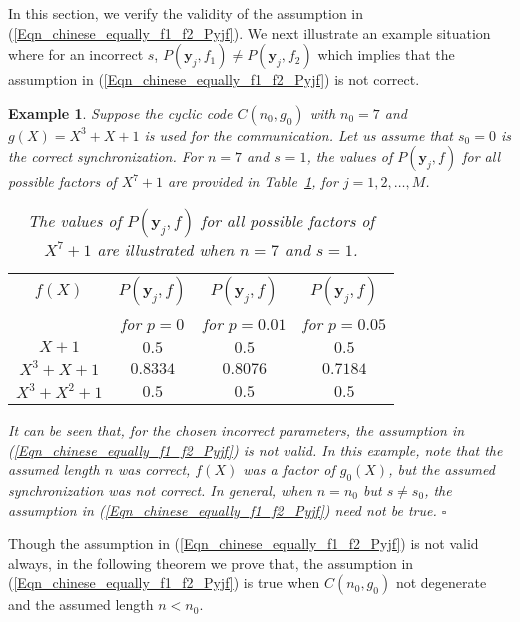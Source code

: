 \documentclass[10pt,journal]{IEEEtran}
\newtheorem{example}{Example}
\begin{document}
In this section, we verify the validity of the assumption in (\ref{Eqn_chinese_equally_f1_f2_Pyjf}).
We next illustrate an example situation where for an incorrect $s$, $P(\mathbf{y}_j,f_1) \neq P(\mathbf{y}_j,f_2)$
which implies that the assumption in (\ref{Eqn_chinese_equally_f1_f2_Pyjf}) is not correct.
% 
\begin{example}
\label{Example_chinese_counterEx}
%  
Suppose the cyclic code $C(n_0,g_0)$ with $n_0=7$ and $g(X)=X^3+X+1$ is used for the communication.
Let us assume that $s_0=0$ is the correct synchronization.
% 
For $n=7$ and $s=1$, the values of $P(\mathbf{y}_j,f)$
for all possible factors of $X^{7}+1$ are provided in Table~\ref{Table_chinese_counterex}, for $j = 1,2,\ldots,M$.
% 
\begin{table}[htbp]
% 
\begin{center}
    \begin{tabular}{| c | c | c | c | }
    \hline
    $f(X)$   	&  $P(\mathbf{y}_j,f)$ 	&  $P(\mathbf{y}_j,f)$ 	&  $P(\mathbf{y}_j,f)$ 	\\ 
         	&  for $p=0$ 		&  for $p=0.01$  	&  for $p=0.05$ 	\\ \hline    
    $X+1$ 	&  $0.5$ 		&  $0.5$ 		&  $0.5$ 		\\ \hline
    $X^3+X+1$ 	&  $0.8334$ 		&  $0.8076$		&  $0.7184$		\\ \hline
    $X^3+X^2+1$ &  $0.5$ 		&  $0.5$ 		&  $0.5$ 		\\ \hline
    \end{tabular}
\end{center}
% 
\caption{The values of $P(\mathbf{y}_j,f)$ for all possible factors of $X^{7}+1$ are illustrated when $n=7$ and $s=1$.}
\label{Table_chinese_counterex}
\end{table}
%
% 
It can be seen that, for the chosen incorrect parameters, the assumption in (\ref{Eqn_chinese_equally_f1_f2_Pyjf})
is not valid.
% 
In this example, note that the assumed length $n$ was correct, $f(X)$ was a factor of $g_0(X)$, but the assumed
synchronization was not correct. In general, when $n=n_0$ but $s\neq s_0$, the  assumption
in (\ref{Eqn_chinese_equally_f1_f2_Pyjf}) need not be true.
% 
\hfill $\square$
% 
\end{example}
% 

Though the assumption in (\ref{Eqn_chinese_equally_f1_f2_Pyjf}) is not valid always, in the following
theorem we prove that, the assumption in (\ref{Eqn_chinese_equally_f1_f2_Pyjf}) is true when 
$C(n_0,g_0)$ not degenerate and the assumed length $n < n_0$.
\end{document}
